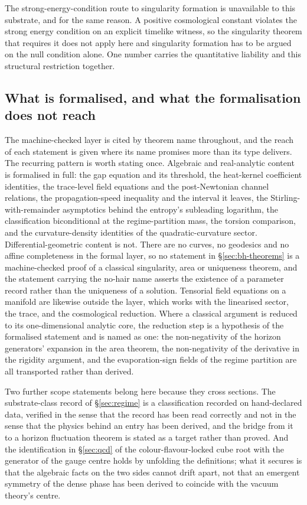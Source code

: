 \documentclass[aps,prd,nofootinbib,superscriptaddress,12pt]{revtex4-2}
\begin{document}
The strong-energy-condition route to singularity formation is unavailable to
this substrate, and for the same reason. A positive cosmological constant
violates the strong energy condition on an explicit timelike witness, so the
singularity theorem that requires it does not apply here and singularity
formation has to be argued on the null condition alone. One number carries the
quantitative liability and this structural restriction together.

\subsection{What is formalised, and what the formalisation does not reach}
\label{sec:scope-formal}

The machine-checked layer is cited by theorem name throughout, and the reach of
each statement is given where its name promises more than its type delivers. The
recurring pattern is worth stating once. Algebraic and real-analytic content is
formalised in full: the gap equation and its threshold, the heat-kernel
coefficient identities, the trace-level field equations and the post-Newtonian
channel relations, the propagation-speed inequality and the interval it leaves,
the Stirling-with-remainder asymptotics behind the entropy's subleading
logarithm, the classification biconditional at the regime-partition mass, the
torsion comparison, and the curvature-density identities of the
quadratic-curvature sector. Differential-geometric content is not. There are no
curves, no geodesics and no affine completeness in the formal layer, so no
statement in \S\ref{sec:bh-theorems} is a machine-checked proof of a classical
singularity, area or uniqueness theorem, and the statement carrying the
no-hair name asserts the existence of a parameter record rather than the
uniqueness of a solution. Tensorial field equations on a manifold are likewise
outside the layer, which works with the linearised sector, the trace, and the
cosmological reduction. Where a classical argument is reduced to its
one-dimensional analytic core, the reduction step is a hypothesis of the
formalised statement and is named as one: the non-negativity of the horizon
generators' expansion in the area theorem, the non-negativity of the derivative
in the rigidity argument, and the evaporation-sign fields of the regime
partition are all transported rather than derived.

Two further scope statements belong here because they cross sections. The
substrate-class record of \S\ref{sec:regime} is a classification recorded on
hand-declared data, verified in the sense that the record has been read
correctly and not in the sense that the physics behind an entry has been
derived, and the bridge from it to a horizon fluctuation theorem is stated as a
target rather than proved. And the identification in \S\ref{sec:qcd} of the
colour-flavour-locked cube root with the generator of the gauge centre holds by
unfolding the definitions; what it secures is that the algebraic facts on the
two sides cannot drift apart, not that an emergent symmetry of the dense phase
has been derived to coincide with the vacuum theory's centre.
\end{document}
